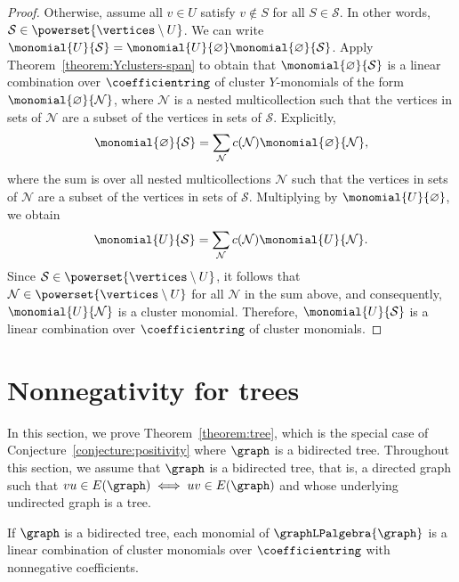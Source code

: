 \begin{proof}
    Otherwise, assume all \(v \in U\) satisfy \(v \not\in S\) for all \(S \in \mathcal{S}\).
    In other words, \(\mathcal{S} \in \powerset{\vertices \setminus U}\).
    We can write
    \( \monomial{U}{\mathcal{S}} = \monomial{U}{\varnothing} \monomial{\varnothing}{\mathcal{S}} \).
    Apply Theorem~\ref{theorem:Yclusters-span} to obtain that \( \monomial{\varnothing}{\mathcal{S}} \) is a linear combination over \(\coefficientring\) of cluster \(Y\)-monomials of the form \(\monomial{\varnothing}{\mathcal{N}}\), where \(\mathcal{N}\) is a nested multicollection such that the vertices in sets of \(\mathcal{N}\) are a subset of the vertices in sets of \(\mathcal{S}\).
    Explicitly,
    \begin{equation*}
        \monomial{\varnothing}{\mathcal{S}} = \sum_{\mathcal{N}} c(\mathcal{N}) \monomial{\varnothing}{\mathcal{N}},
    \end{equation*}
    where the sum is over all nested multicollections \(\mathcal{N}\) such that the vertices in sets of \(\mathcal{N}\) are a subset of the vertices in sets of \(\mathcal{S}\).
    Multiplying by \(\monomial{U}{\varnothing}\), we obtain
    \begin{equation*}
        \monomial{U}{\mathcal{S}} = \sum_{\mathcal{N}} c(\mathcal{N}) \monomial{U}{\mathcal{N}}.
    \end{equation*}
    Since \(\mathcal{S} \in \powerset{\vertices \setminus U}\), it follows that \(\mathcal{N} \in \powerset{\vertices \setminus U}\) for all \(\mathcal{N}\) in the sum above, and consequently, \(\monomial{U}{\mathcal{N}}\) is a cluster monomial.
    Therefore, \(\monomial{U}{\mathcal{S}}\) is a linear combination over \(\coefficientring\) of cluster monomials.
\end{proof}

\section{Nonnegativity for trees}\label{section:trees}

In this section, we prove Theorem~\ref{theorem:tree}, which is the special case of Conjecture~\ref{conjecture:positivity} where \(\graph\) is a bidirected tree.
Throughout this section, we assume that \(\graph\) is a bidirected tree,
that is, a directed graph such that \(vu \in E(\graph) \iff uv \in E(\graph)\) and whose underlying undirected graph is a tree.

\begin{theo*}
    If \(\graph\) is a bidirected tree, each monomial of \(\graphLPalgebra{\graph}\) is a linear combination of cluster monomials over \(\coefficientring\) with nonnegative coefficients.
\end{theo*}

